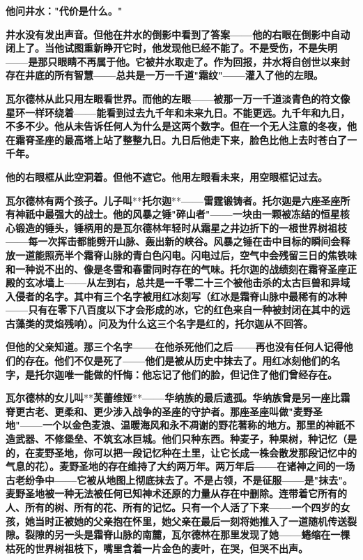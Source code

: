 \documentclass[12pt,a4paper,openany]{ctexbook}
\begin{document}
\textbf{他问井水："代价是什么。"}


\textbf{井水没有发出声音。但他在井水的倒影中看到了答案——他的右眼在倒影中自动闭上了。当他试图重新睁开它时，他发现他已经不能了。不是受伤，不是失明——是那只眼睛不再属于他。它被井水取走了。作为回报，井水将自创世以来封存在井底的所有智慧——总共是一万一千道"霜纹"——灌入了他的左眼。}


\textbf{瓦尔德林从此只用左眼看世界。而他的左眼——被那一万一千道淡青色的符文像星环一样环绕着——能看到过去九千年和未来九日。不能更远。九千年和九日，不多不少。他从未告诉任何人为什么是这两个数字。但在一个无人注意的冬夜，他在霜脊圣座的最高塔上站了整整九日。九日后他走下来，脸色比他上去时苍白了一千年。}


\textbf{他的右眼框从此空洞着。但他不遮它。他用左眼看未来，用空眼框记过去。}


\textbf{瓦尔德林有两个孩子。儿子叫}**\textbf{托尔迦}**\textbf{——雷霆锻铸者。托尔迦是六座圣座所有神祇中最强大的战士。他的风暴之锤"碎山者"——一块由一颗被冻结的恒星核心锻造的锤头，锤柄用的是瓦尔德林年轻时从霜星之井边折下的一根世界树祖枝——每一次挥击都能劈开山脉、轰出新的峡谷。风暴之锤在击中目标的瞬间会释放一道能照亮半个霜脊山脉的青白色闪电。闪电过后，空气中会残留三日的焦铁味和一种说不出的、像是冬雪和春雷同时存在的气味。托尔迦的战绩刻在霜脊圣座正殿的玄冰墙上——从左到右，总共是一千零二十三个被他击杀的太古巨兽和异域入侵者的名字。其中有三个名字被用红冰刻写（红冰是霜脊山脉中最稀有的冰种——只有在零下八百度以下才会形成的冰，它的红色来自一种被封闭在其中的远古藻类的灵焰残响）。问及为什么这三个名字是红的，托尔迦从不回答。}


\textbf{但他的父亲知道。那三个名字——在他杀死他们之后——再也没有任何人记得他们的存在。他们不仅是死了——他们是被从历史中抹去了。用红冰刻他们的名字，是托尔迦唯一能做的忏悔：他忘记了他们的脸，但记住了他们曾经存在。}


\textbf{瓦尔德林的女儿叫}**\textbf{芙蕾维娅}**\textbf{——华纳族的最后遗孤。华纳族曾是另一座比霜脊更古老、更柔和、更少涉入战争的圣座的守护者。那座圣座叫做"麦野圣地"——一个以金色麦浪、温暖海风和永不凋谢的野花著称的地方。那里的神祇不造武器、不修堡垒、不筑玄冰巨城。他们只种东西。种麦子，种果树，种记忆（是的，在麦野圣地，你可以把一段记忆种在土里，让它长成一株会散发那段记忆中的气息的花）。麦野圣地的存在维持了大约两万年。两万年后——在诸神之间的一场古老纷争中——它被从地图上彻底抹去了。不是占领，不是征服——是"抹去"。麦野圣地被一种无法被任何已知神术还原的力量从存在中删除。连带着它所有的人、所有的树、所有的花、所有的记忆。只有一个人活了下来——一个四岁的女孩，她当时正被她的父亲抱在怀里，她父亲在最后一刻将她推入了一道随机传送裂隙。裂隙的另一头是霜脊山脉的南麓，瓦尔德林在那里发现了她——蜷缩在一棵枯死的世界树祖枝下，嘴里含着一片金色的麦叶，在哭，但哭不出声。}
\end{document}

